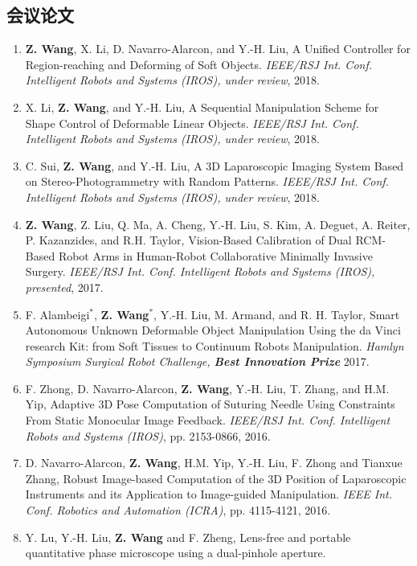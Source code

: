 \documentclass[10pt,letterpaper]{article}
\begin{document}
\subsection*{会议论文}
\begin{enumerate}
    \item \textbf{Z. Wang}, X. Li, D. Navarro-Alarcon, and Y.-H. Liu,
    A Unified Controller for Region-reaching and Deforming of Soft Objects.
    \textit{{IEEE/RSJ} Int. Conf. Intelligent Robots and Systems (IROS), under review}, 2018.
    \item X. Li, \textbf{Z. Wang}, and Y.-H. Liu,
    A Sequential Manipulation Scheme for Shape Control of Deformable Linear Objects.
    \textit{{IEEE/RSJ} Int. Conf. Intelligent Robots and Systems (IROS), under review}, 2018.
    \item C. Sui, \textbf{Z. Wang}, and Y.-H. Liu,
    A 3D Laparoscopic Imaging System Based on Stereo-Photogrammetry with Random Patterns.
    \textit{{IEEE/RSJ} Int. Conf. Intelligent Robots and Systems (IROS), under review}, 2018.
    \item \textbf{Z. Wang}, Z. Liu, Q. Ma, A. Cheng, Y.-H. Liu, S. Kim, A. Deguet, A. Reiter, P. Kazanzides, and R.H. Taylor,
    Vision-Based Calibration of Dual RCM-Based Robot Arms in Human-Robot Collaborative Minimally Invasive Surgery.
    \textit{{IEEE/RSJ} Int. Conf. Intelligent Robots and Systems (IROS), presented}, 2017.
    \item F. Alambeigi$^*$, \textbf{Z. Wang}$^*$, Y.-H. Liu, M. Armand, and R. H. Taylor,
    Smart Autonomous Unknown Deformable Object Manipulation Using the da Vinci research Kit: from Soft Tissues to Continuum Robots Manipulation.
    \textit{Hamlyn Symposium Surgical Robot Challenge, \textbf{Best Innovation Prize}} 2017.
    \item F. Zhong, D. Navarro-Alarcon, \textbf{Z. Wang}, Y.-H. Liu, T. Zhang, and H.M. Yip,
    Adaptive 3D Pose Computation of Suturing Needle Using Constraints From Static Monocular Image Feedback.
    \textit{{IEEE/RSJ} Int. Conf. Intelligent Robots and Systems (IROS)}, pp. 2153-0866, 2016.
    \item D. Navarro-Alarcon, \textbf{Z. Wang}, H.M. Yip, Y.-H. Liu, F. Zhong and Tianxue Zhang,
    Robust Image-based Computation of the 3D Position of Laparoscopic Instruments and its Application to Image-guided Manipulation.
    \textit{{IEEE} Int. Conf. Robotics and Automation (ICRA)}, pp. 4115-4121, 2016.
    \item Y. Lu, Y.-H. Liu, \textbf{Z. Wang} and F. Zheng,
    Lens-free and portable quantitative phase microscope using a dual-pinhole aperture.

\end{enumerate}
\end{document}
